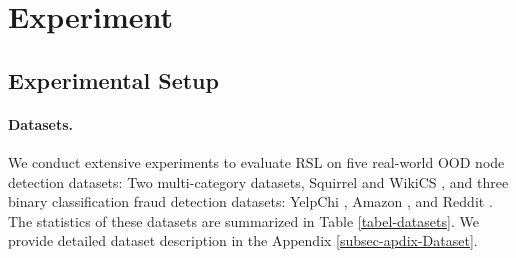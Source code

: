 \section{Experiment}
\label{Sec-Experiment}


\subsection{Experimental Setup}\label{subsec-Experimental-Setup}
\paragraph{Datasets.}
We conduct extensive experiments to evaluate RSL on five real-world OOD node detection datasets: Two multi-category datasets, Squirrel \citep{rozemberczki2021multi} and WikiCS \citep{mernyei2020wiki}, and three binary classification fraud detection datasets: YelpChi \citep{rayana2015collective}, Amazon \citep{mcauley2013amateurs}, and Reddit \citep{kumar2019predicting}.
The statistics of these datasets are summarized in Table \ref{tabel-datasets}. We
provide detailed dataset description in the Appendix \ref{subsec-apdix-Dataset}.

